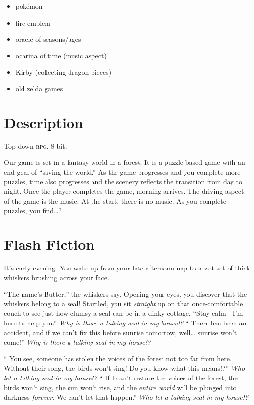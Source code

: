 \documentclass{article}
\begin{document}
\begin{itemize}
\item pok\'emon
\item fire emblem
\item oracle of seasons\slash ages
\item ocarina of time (music aspect)
\item Kirby (collecting dragon pieces)
\item old zelda games
\end{itemize}

\section{Description}
\label{sec:description}

Top-down \textsc{rpg}.
8-bit.

Our game is set in a fantasy world in a forest.
It is a puzzle-based game with an end goal of \enquote{saving the world.}
As the game progresses and you complete more puzzles,
  time also progresses and the scenery reflects the transition from day to night.
Once the player completes the game, morning arrives.
The driving aspect of the game is the music.
At the start, there is no music.
As you complete puzzles, you find\dots ?

\newpage

\section{Flash Fiction}
\label{sec:flash-fiction}

\def\thought{\textsl}

It's early evening.
You wake up from your late-afternoon nap to
  a wet set of thick whiskers
  brushing across your face.

\enquote{The name's Butter,} the whiskers say.
Opening your eyes, you discover that the whiskers belong to a seal!
Startled, you sit \emph{straight} up on that once-comfortable couch
  to see just how clumsy a seal can be in a dinky cottage.
\enquote{Stay calm---I'm here to help you.}
\thought{Why is there a talking seal in my house!?}
\enquote{%
  There has been an accident, and
  if we can't fix this before sunrise tomorrow, well\dots
  sunrise won't come!}
\thought{Why is there a talking seal in my house!?}

\enquote{%
  You see, someone has stolen
  the voices of the forest
  not too far from here.
  Without their song, the birds won't sing!
  Do you know what this means!?}
\thought{Who let a talking seal in my house!?}
\enquote{%
  If I can't restore the
  voices of the forest,
  the birds won't sing,
  the sun won't rise,
  and the \emph{entire world} will be
  plunged into darkness \emph{forever}.
  We can't let that happen.}
\thought{Who let a talking seal in my house!?}
\end{document}

